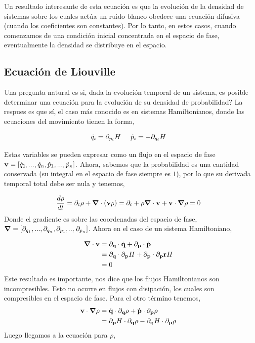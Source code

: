 \documentclass[executivepaper,12pt]{article}
\numberwithin{equation}{section}
\begin{document}
Un resultado interesante de esta ecuación es que la evolución de la densidad de sistemas sobre los cuales actúa un ruido blanco obedece una ecuación difusiva (cuando los coeficientes son constantes). Por lo tanto, en estos casos, cuando comenzamos de una condición inicial concentrada en el espacio de fase, eventualmente la densidad se distribuye en el espacio. 

\subsection{Ecuación de Liouville}

Una pregunta natural es si, dada la evolución temporal de un sistema, es posible determinar una ecuación para la evolución de su densidad de probabilidad? La respues es que sí, el caso más conocido es en sistemas Hamiltonianos, donde las ecuaciones del movimiento tienen la forma,

\begin{equation*}
	 \dot{q}_i=\partial_{p_i} H \hspace{0.5cm} \dot{p}_i=-\partial_{q_i} H
\end{equation*} 

Estas variables se pueden expresar como un flujo en el espacio de fase $\vb{v}=[\dot{q}_1,...,\dot{q}_n,\dot{p}_1,...,\dot{p}_n]$. Ahora, sabemos que la probabilidad es una cantidad conservada (su integral en el espacio de fase siempre es $1$), por lo que su derivada temporal total debe ser nula y tenemos,

\begin{equation*}
	\frac{d \rho}{dt}=\partial_t \rho +\grad{}\cdot (\vb{v}\rho)=\partial_t +\rho\grad{}\cdot \vb{v} +\vb{v}\cdot\grad{} \rho =0
\end{equation*}
Donde el gradiente es sobre las coordenadas del espacio de fase, $\grad{}=[\partial_{q_1},...,\partial_{q_n},\partial_{p_1},..,\partial_{p_n}]$. Ahora en el caso de un sistema Hamiltoniano,

\begin{align*}
	\grad{}\cdot \vb{v}&=\partial_{\vb{q}} \cdot \dot{\vb{q}}+\partial_{\vb{p}}\cdot \dot{\vb{p}}\\
	&=\partial_{\vb{q}} \cdot \partial_{\vb{p}} H+\partial_{\vb{p}} \cdot \partial_{\vb{p}}\vb{r} H\\
	&=0
\end{align*}
Este resultado es importante, nos dice que los flujos Hamiltonianos son incompresibles. Esto no ocurre en flujos con disipación, los cuales son compresibles en el espacio de fase. 
Para el otro término tenemos,
\begin{align*}
	\vb{v}\cdot\grad{}\rho&=\dot{\vb{q}}\cdot\partial_{\vb{q}}\rho + \dot{\vb{p}}\cdot  \partial_{\vb{p}} \rho\\
	&=\partial_{\vb{p}}H\cdot \partial_{\vb{q}}\rho -\partial_{\vb{q}}H\cdot\partial_{\vb{p}}\rho
\end{align*}
Luego llegamos a la ecuación para $\rho$,
\end{document}
